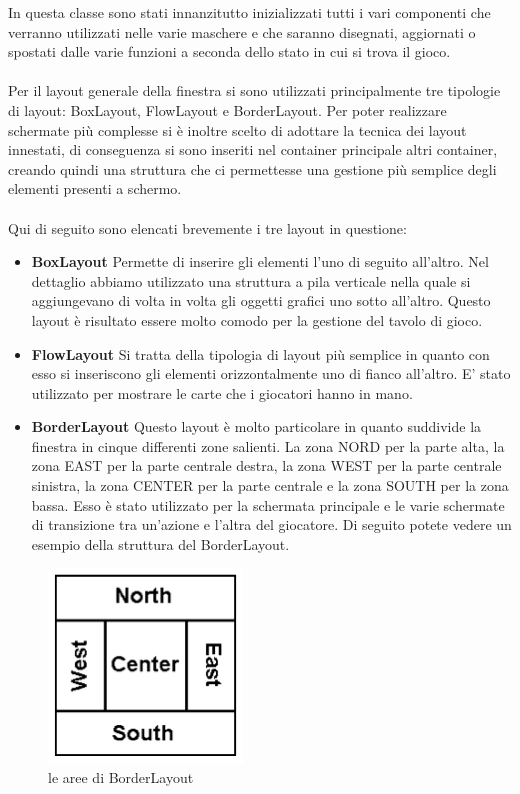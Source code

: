 			In questa classe sono stati innanzitutto inizializzati tutti i vari componenti che verranno utilizzati nelle varie maschere e che saranno disegnati, aggiornati o spostati dalle varie funzioni a seconda dello stato in cui si trova il gioco. \\\\
			
			Per il layout generale della finestra si sono utilizzati principalmente tre tipologie di layout: BoxLayout, FlowLayout e BorderLayout. Per poter realizzare schermate più complesse si è inoltre scelto di adottare la tecnica dei layout innestati, di conseguenza si sono inseriti nel container principale altri container, creando quindi una struttura che ci permettesse una gestione più semplice degli elementi presenti a schermo. \\\\
			
			Qui di seguito sono elencati brevemente i tre layout in questione: 
			\begin{itemize}
				\item \textbf{BoxLayout} Permette di inserire gli elementi l’uno di seguito all’altro. Nel dettaglio abbiamo utilizzato una struttura a pila verticale nella quale si aggiungevano di volta in volta gli oggetti grafici uno sotto all’altro. Questo layout è risultato essere molto comodo per la gestione del tavolo di gioco.
				\item \textbf{FlowLayout} Si tratta della tipologia di layout più semplice in quanto con esso si inseriscono gli elementi orizzontalmente uno di fianco all’altro. E’ stato utilizzato per mostrare le carte che i giocatori hanno in mano.
				\item \textbf{BorderLayout} Questo layout è molto particolare in quanto suddivide la finestra in cinque differenti zone salienti. La zona NORD per la parte alta, la zona EAST per la parte centrale destra, la zona WEST per la parte centrale sinistra, la zona CENTER per la parte centrale e la zona SOUTH per la zona bassa. Esso è stato utilizzato per la schermata principale e le varie schermate di transizione tra un’azione e l’altra del giocatore. Di seguito potete vedere un esempio della struttura del BorderLayout.
			\end{itemize}
			
			\begin{figure}[h]
				\centering
				\includegraphics[scale=0.6]{3.png}
				\caption{le aree di BorderLayout}
				\label{fig3}
			\end{figure}
				
